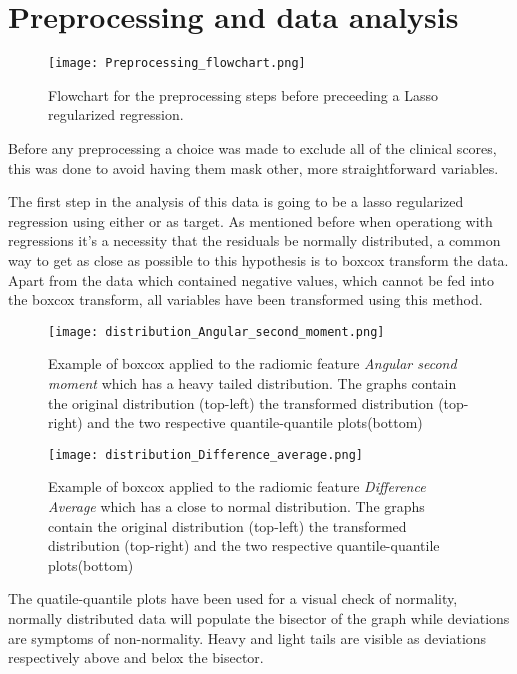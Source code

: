 \section{Preprocessing and data analysis}
\begin{figure}
\texttt{[image: Preprocessing\_flowchart.png]}
\caption{Flowchart for the preprocessing steps before preceeding a Lasso regularized regression. \label{fig:preprocFlowchart}}
\end{figure}

Before any preprocessing a choice was made to exclude all of the clinical scores, this was done to avoid having them mask other, more straightforward variables.

The first step in the analysis of this data is going to be a lasso regularized regression using either \death or \icu as target. As mentioned before when operationg with regressions it's a necessity that the residuals be normally distributed, a common way to get as close as possible to this hypothesis is to boxcox transform the data. Apart from the data which contained negative values, which cannot be fed into the boxcox transform, all variables have been transformed using this method.

\begin{figure}[htbp]
  		\texttt{[image: distribution\_Angular\_second\_moment.png]}
        \caption{Example of boxcox applied to the radiomic feature \textit{Angular second moment} which has a heavy tailed distribution. The graphs contain the original distribution (top-left) the transformed distribution (top-right) and the two respective quantile-quantile plots(bottom) \label{fig:boxcox_example}}
\end{figure}

\begin{figure}[htbp]
  		\texttt{[image: distribution\_Difference\_average.png]}
        \caption{Example of boxcox applied to the radiomic feature \textit{Difference Average} which has a close to normal distribution. The graphs contain the original distribution (top-left) the transformed distribution (top-right) and the two respective quantile-quantile plots(bottom) \label{fig:boxcox_example_normal}}
\end{figure}

The quatile-quantile plots have been used for a visual check of normality, normally distributed data will populate the bisector of the graph while deviations are symptoms of non-normality. Heavy and light tails are visible as deviations respectively above and belox the bisector.

